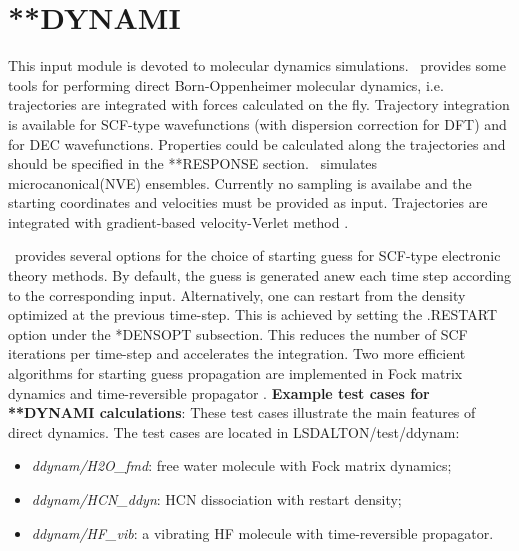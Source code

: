 \section{**DYNAMI}\label{sec:dynami}
This input module is devoted to molecular dynamics simulations. \lsdalton\ provides some tools for performing
direct Born-Oppenheimer molecular dynamics, i.e. trajectories are integrated with forces calculated on the fly.
Trajectory integration is available for SCF-type wavefunctions (with dispersion correction for DFT)
  and for DEC wavefunctions. Properties could be calculated along the trajectories and should be
 specified in the **RESPONSE section.
\lsdalton\ simulates microcanonical(NVE) ensembles. Currently no sampling is availabe and the starting coordinates
and velocities must be provided as input. Trajectories are integrated with gradient-based velocity-Verlet 
method \cite{Verlet}. 

\lsdalton\ provides several options for the choice of starting guess for SCF-type electronic theory methods. By
default, the guess is generated anew each time step according to the corresponding input. Alternatively, one can
restart from the density optimized at the previous time-step. This is achieved by setting the .RESTART option under
the *DENSOPT subsection. This reduces the number of SCF iterations per time-step and accelerates the integration. 
Two more efficient algorithms for starting guess propagation are implemented in \lsdalton\: Fock matrix dynamics \cite{FMD} 
 and time-reversible propagator \cite{TimRev}.  
\newline
\vspace{1 cm}
\noindent
\textbf{Example test cases for **DYNAMI calculations}: \newline
These test cases illustrate the main features of direct dynamics. The test cases are located in LSDALTON/test/ddynam:
\begin{itemize}
\item
\textit{ddynam/H2O\_fmd}: free water molecule with Fock matrix dynamics; 
\item
\textit{ddynam/HCN\_ddyn}: HCN dissociation with restart density; 
\item
\textit{ddynam/HF\_vib}: a vibrating HF molecule with time-reversible propagator.
\end{itemize}

